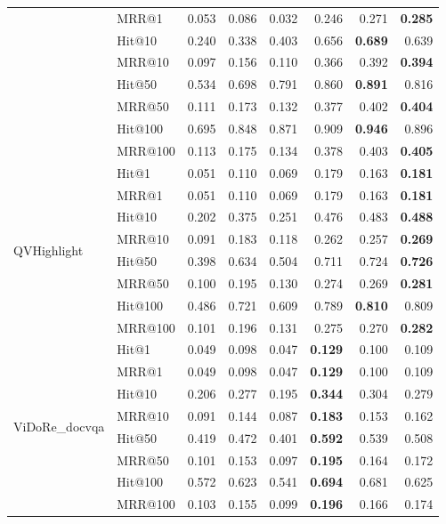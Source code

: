\begin{table}[!t]
\begin{tabular*}{\textwidth}{@{\extracolsep{\fill}}llrrrrrr@{}}
 & MRR@1 & 0.053 & 0.086 & 0.032 & 0.246 & 0.271 & \textbf{0.285} \\
 & Hit@10 & 0.240 & 0.338 & 0.403 & 0.656 & \textbf{0.689} & 0.639 \\
 & MRR@10 & 0.097 & 0.156 & 0.110 & 0.366 & 0.392 & \textbf{0.394} \\
 & Hit@50 & 0.534 & 0.698 & 0.791 & 0.860 & \textbf{0.891} & 0.816 \\
 & MRR@50 & 0.111 & 0.173 & 0.132 & 0.377 & 0.402 & \textbf{0.404} \\
 & Hit@100 & 0.695 & 0.848 & 0.871 & 0.909 & \textbf{0.946} & 0.896 \\
 & MRR@100 & 0.113 & 0.175 & 0.134 & 0.378 & 0.403 & \textbf{0.405} \\
\midrule
\multirow{8}{*}{QVHighlight} & Hit@1 & 0.051 & 0.110 & 0.069 & 0.179 & 0.163 & \textbf{0.181} \\
 & MRR@1 & 0.051 & 0.110 & 0.069 & 0.179 & 0.163 & \textbf{0.181} \\
 & Hit@10 & 0.202 & 0.375 & 0.251 & 0.476 & 0.483 & \textbf{0.488} \\
 & MRR@10 & 0.091 & 0.183 & 0.118 & 0.262 & 0.257 & \textbf{0.269} \\
 & Hit@50 & 0.398 & 0.634 & 0.504 & 0.711 & 0.724 & \textbf{0.726} \\
 & MRR@50 & 0.100 & 0.195 & 0.130 & 0.274 & 0.269 & \textbf{0.281} \\
 & Hit@100 & 0.486 & 0.721 & 0.609 & 0.789 & \textbf{0.810} & 0.809 \\
 & MRR@100 & 0.101 & 0.196 & 0.131 & 0.275 & 0.270 & \textbf{0.282} \\
\midrule
\multirow{8}{*}{ViDoRe\_docvqa} & Hit@1 & 0.049 & 0.098 & 0.047 & \textbf{0.129} & 0.100 & 0.109 \\
 & MRR@1 & 0.049 & 0.098 & 0.047 & \textbf{0.129} & 0.100 & 0.109 \\
 & Hit@10 & 0.206 & 0.277 & 0.195 & \textbf{0.344} & 0.304 & 0.279 \\
 & MRR@10 & 0.091 & 0.144 & 0.087 & \textbf{0.183} & 0.153 & 0.162 \\
 & Hit@50 & 0.419 & 0.472 & 0.401 & \textbf{0.592} & 0.539 & 0.508 \\
 & MRR@50 & 0.101 & 0.153 & 0.097 & \textbf{0.195} & 0.164 & 0.172 \\
 & Hit@100 & 0.572 & 0.623 & 0.541 & \textbf{0.694} & 0.681 & 0.625 \\
 & MRR@100 & 0.103 & 0.155 & 0.099 & \textbf{0.196} & 0.166 & 0.174 \\

\end{tabular*}
\end{table}
